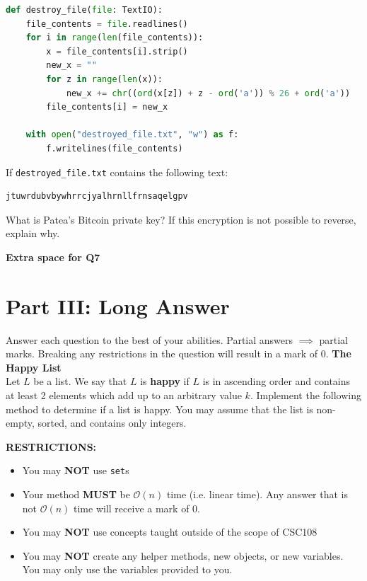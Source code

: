 \documentclass[letterpaper,12pt,addpoints]{exam}
\begin{document}
\begin{questions}
\begin{lstlisting}[language=Python, style=mystyle]
def destroy_file(file: TextIO):
    file_contents = file.readlines()
    for i in range(len(file_contents)):
        x = file_contents[i].strip()
        new_x = ""
        for z in range(len(x)):
            new_x += chr((ord(x[z]) + z - ord('a')) % 26 + ord('a'))
        file_contents[i] = new_x

    with open("destroyed_file.txt", "w") as f:
        f.writelines(file_contents)
    \end{lstlisting}

    If \texttt{destroyed\_file.txt} contains the following text:
    \begin{lstlisting}[language=Python, style=mystyle]
jtuwrdubvbywhrrcjyalhrnllfrnsaqelgpv
    \end{lstlisting}
    What is Patea's Bitcoin private key? If this encryption is not possible to reverse, explain why.

    \clearpage

    \begin{center}
        \textbf{Extra space for Q7}\\        
    \end{center}
    \clearpage

    \section*{Part III: Long Answer} 
    \setcounter{question}{0}
    Answer each question to the best of your abilities. Partial answers $\implies$ partial marks. Breaking any restrictions in the question will result in a mark of 0.
    \question[10] \textbf{The Happy List} \\
    Let $L$ be a list. We say that $L$ is \textbf{happy} if $L$ is in ascending order and contains at least 2 elements which add up to an arbitrary value $k$. Implement the following method to determine if a list is happy. You may assume that the list is non-empty, sorted, and contains only integers.

    \begin{center}
        
        \textbf{RESTRICTIONS:}
        \begin{itemize}
            \item You may \textbf{NOT} use \texttt{set}s
            \item Your method \textbf{MUST} be $\mathcal{O}(n)$ time (i.e. linear time). Any answer that is not $\mathcal{O}(n)$ time will receive a mark of 0.
            \item You may \textbf{NOT} use concepts taught outside of the scope of CSC108
            \item You may \textbf{NOT} create any helper methods, new objects, or new variables. You may only use the variables provided to you.
        \end{itemize}
    \end{center}


\end{questions}
\end{document}
